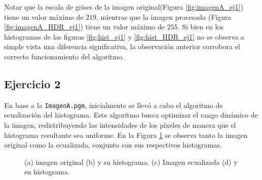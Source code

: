 \documentclass[11pt, twocolumn]{article}
\begin{document}
Notar que la escala de grises de la imagen original(Figura \ref{fig:imagenA_ej1}) tiene un valor máximo de $219$, mientras que la imagen procesada (Figura \ref{fig:imagenA_HDR_ej1}) tiene un valor máximo de $255$. Si bien en los histogramas de las figuras \ref{fig:hist_ej1} y \ref{fig:hist_HDR_ej1} no se observa a simple vista una diferencia significativa, la observación anterior corrobora el correcto funcionamiento del algoritmo.


\subsection*{Ejercicio 2}
En base a la \texttt{ImagenA.pgm}, inicialmente se llevó a cabo el algoritmo de ecualización del histograma. Este algoritmo busca optimizar el rango dinámico de la imagen, redistribuyendo las intensidades de los píxeles de manera que el histograma resultante sea uniforme. En la Figura \ref{fig:figuras_ej_2} se observa tanto la imagen original como la ecualizada, conjunto con sus respectivos histogramas.

\begin{figure}[htbp]
  \centering
  \hfill
  \hfill
  \hfill
  \hfill
  \caption{(a) imagen original (b) y su histograma. (c) Imagen ecualizada (d) y su histograma.}
  \label{fig:figuras_ej_2}
\end{figure}
\end{document}
